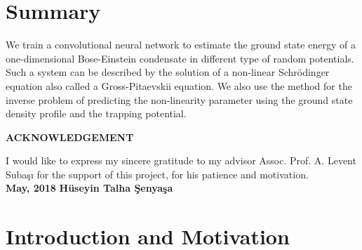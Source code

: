 \documentclass[a4paper,times,hidelinks,12pt]{article}
\begin{document}
\setcounter{page}{1}

\section*{Summary}

We train a convolutional neural network to estimate the ground state energy
of a one-dimensional Bose-Einstein condensate in different type of random potentials.
Such a system can be described by the solution of a non-linear Schr{\"o}dinger equation also called a Gross-Pitaevskii equation. We also use the method for the inverse problem of predicting the non-linearity parameter using the ground state density profile and the trapping potential.
\vspace*{\fill}


\newpage

\begin{center}
\vspace*{4 cm}
\textbf{ACKNOWLEDGEMENT} \\[10 pt]
\end{center}
I would like to express my sincere gratitude to my advisor  Assoc. Prof. A. Levent Suba\c{s}{\i} for the support of this project, for his patience and motivation.\\
\textbf{May, 2018} \hspace{7.75 cm}\textbf{H{\"u}seyin Talha \c{S}enya\c{s}a}


\vspace*{\fill}

\newpage
\tableofcontents

\newpage

\section{Introduction and Motivation}


\label{sec:Intro}
\end{document}
